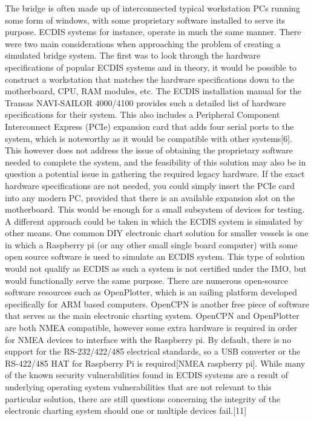 \documentclass{report}
\begin{document}
The bridge is often made up of interconnected typical workstation PCs running some form of windows, with some proprietary software installed to serve its purpose. ECDIS systems for instance, operate in much the same manner. There were two main considerations when approaching the problem of creating a simulated bridge system. The first was to look through the hardware specifications of popular ECDIS systems and in theory, it would be possible to construct a workstation that matches the hardware specifications down to the motherboard, CPU, RAM modules, etc. The ECDIS installation manual for the Transas NAVI-SAILOR 4000/4100 provides such a detailed list of hardware specifications for their system. This also includes a Peripheral Component Interconnect Express (PCIe) expansion card that adds four serial ports to the system, which is noteworthy as it would be compatible with other systems[6]. This however does not address the issue of obtaining the proprietary software needed to complete the system, and the feasibility of this solution may also be in question a potential issue in gathering the required legacy hardware. If the exact hardware specifications are not needed, you could simply insert the PCIe card into any modern PC, provided that there is an available expansion slot on the motherboard. This would be enough for a small subsystem of devices for testing.
\vspace{5mm} %
A different approach could be taken in which the ECDIS system is simulated by other means. One common DIY electronic chart solution for smaller vessels is one in which a Raspberry pi (or any other small single board computer) with some open source software is used to simulate an ECDIS system. This type of solution would not qualify as ECDIS as such a system is not certified under the IMO, but would functionally serve the same purpose. There are numerous open-source software resources such as OpenPlotter, which is an sailing platform developed specifically for ARM based computers. OpenCPN is another free piece of software that serves as the main electronic charting system. OpenCPN and OpenPlotter are both NMEA compatible, however some extra hardware is required in order for NMEA devices to interface with the Raspberry pi. By default, there is no support for the RS-232/422/485 electrical standards, so a USB converter or the RS-422/485 HAT for Raspberry Pi is required[NMEA raspberry pi]. While many of the known security vulnerabilities found in ECDIS systems are a result of underlying operating system vulnerabilities that are not relevant to this particular solution, there are still questions concerning the integrity of the electronic charting system should one or multiple devices fail.[11]
\end{document}
